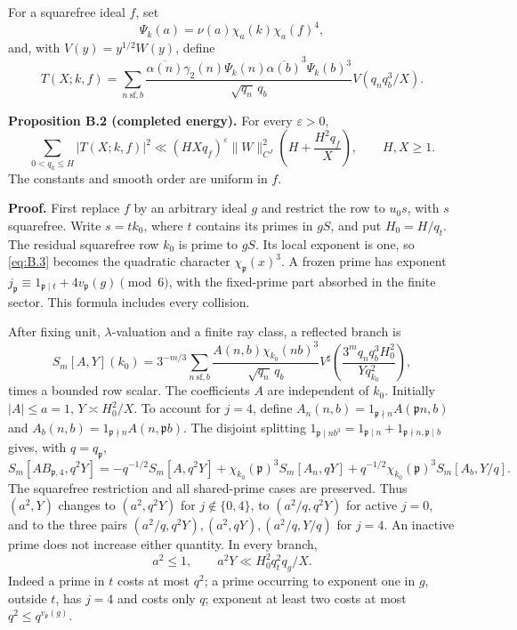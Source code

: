 \documentclass[11pt,a4paper]{article}
\begin{document}
For a squarefree ideal \(f\), set \[
\Psi_k(a)=\nu(a)\chi_a(k)\chi_a(f)^4,
\] and, with \(V(y)=y^{1/2}W(y)\), define \[
T(X;k,f)=\sum_{n\ \mathrm{sf},b}
\frac{\overline{\alpha(n)}\gamma_2(n)\Psi_k(n)
\overline{\alpha(b)}^{3}\Psi_k(b)^3}{\sqrt{q_n}\,q_b}
V(q_nq_b^3/X).
\tag{B.12}\label{eq:B.12}
\]

\textbf{Proposition B.2 (completed energy).} For every \(\varepsilon>0\), \[
\sum_{0<q_k\le H}|T(X;k,f)|^2
\ll(HXq_f)^\varepsilon\|W\|_{C^J}^2
\left(H+\frac{H^2q_f}{X}\right),\qquad H,X\ge1.
\tag{B.13}\label{eq:B.13}
\] The constants and smooth order are uniform in \(f\).

\textbf{Proof.} First replace \(f\) by an arbitrary ideal \(g\) and restrict the row to \(u_0s\), with \(s\) squarefree. Write \(s=tk_0\), where \(t\) contains its primes in \(gS\), and put \(H_0=H/q_t\). The residual squarefree row \(k_0\) is prime to \(gS\). Its local exponent is one, so \eqref{eq:B.3} becomes the quadratic character \(\chi_{\mathfrak p}(x)^3\). A frozen prime has exponent \(j_{\mathfrak p}\equiv1_{\mathfrak p\mid t}+4v_{\mathfrak p}(g)\pmod6\), with the fixed-prime part absorbed in the finite sector. This formula includes every collision.

After fixing unit, \(\lambda\)-valuation and a finite ray class, a reflected branch is \[
S_m[A,Y](k_0)=3^{-m/3}\sum_{n\ \mathrm{sf},b}
\frac{A(n,b)\chi_{k_0}(nb)^3}{\sqrt{q_n}\,q_b}
V^\sharp\!\left(\frac{3^mq_nq_b^3H_0^2}{Yq_{k_0}^2}\right),
\tag{B.14}\label{eq:B.14}
\] times a bounded row scalar. The coefficients \(A\) are independent of \(k_0\). Initially \(|A|\le a=1\), \(Y\asymp H_0^2/X\). To account for \(j=4\), define \(A_n(n,b)=1_{\mathfrak p\nmid n}A(\mathfrak pn,b)\) and \(A_b(n,b)=1_{\mathfrak p\nmid n}A(n,\mathfrak pb)\). The disjoint splitting \(1_{\mathfrak p\mid nb^3}=1_{\mathfrak p\mid n}+1_{\mathfrak p\nmid n,\mathfrak p\mid b}\) gives, with \(q=q_{\mathfrak p}\), \[
S_m[AB_{\mathfrak p,4},q^2Y]
=-q^{-1/2}S_m[A,q^2Y]
+\chi_{k_0}(\mathfrak p)^3S_m[A_n,qY]
+q^{-1/2}\chi_{k_0}(\mathfrak p)^3S_m[A_b,Y/q].
\tag{B.15}\label{eq:B.15}
\] The squarefree restriction and all shared-prime cases are preserved. Thus \((a^2,Y)\) changes to \((a^2,q^2Y)\) for \(j\notin\{0,4\}\), to \((a^2/q,q^2Y)\) for active \(j=0\), and to the three pairs \((a^2/q,q^2Y),(a^2,qY),(a^2/q,Y/q)\) for \(j=4\). An inactive prime does not increase either quantity. In every branch, \[
a^2\le1,\qquad a^2Y\ll H_0^2q_t^2q_g/X.
\tag{B.16}\label{eq:B.16}
\] Indeed a prime in \(t\) costs at most \(q^2\); a prime occurring to exponent one in \(g\), outside \(t\), has \(j=4\) and costs only \(q\); exponent at least two costs at most \(q^2\le q^{v_{\mathfrak p}(g)}\).
\end{document}

